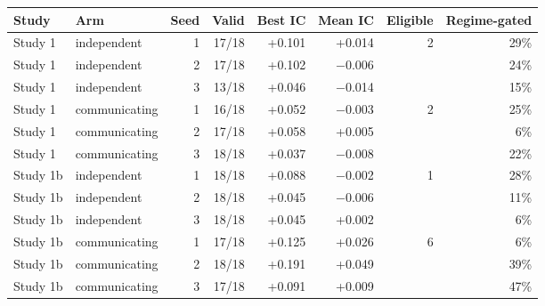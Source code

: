 \begin{tabular}{llrrrrrr}
\toprule
Study & Arm & Seed & Valid & Best IC & Mean IC & Eligible & Regime-gated \\
\midrule
Study 1 & independent & 1 & 17/18 & +0.101 & +0.014 & 2 & 29\% \\
Study 1 & independent & 2 & 17/18 & +0.102 & $-$0.006 &  & 24\% \\
Study 1 & independent & 3 & 13/18 & +0.046 & $-$0.014 &  & 15\% \\
Study 1 & communicating & 1 & 16/18 & +0.052 & $-$0.003 & 2 & 25\% \\
Study 1 & communicating & 2 & 17/18 & +0.058 & +0.005 &  & 6\% \\
Study 1 & communicating & 3 & 18/18 & +0.037 & $-$0.008 &  & 22\% \\
Study 1b & independent & 1 & 18/18 & +0.088 & $-$0.002 & 1 & 28\% \\
Study 1b & independent & 2 & 18/18 & +0.045 & $-$0.006 &  & 11\% \\
Study 1b & independent & 3 & 18/18 & +0.045 & +0.002 &  & 6\% \\
Study 1b & communicating & 1 & 17/18 & +0.125 & +0.026 & 6 & 6\% \\
Study 1b & communicating & 2 & 18/18 & +0.191 & +0.049 &  & 39\% \\
Study 1b & communicating & 3 & 17/18 & +0.091 & +0.009 &  & 47\% \\
\bottomrule
\end{tabular}
